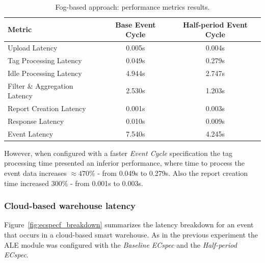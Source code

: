 \begin{table}[ht!]
  \centering
    \begin{tabular}{|l|c|c|}
    \hline
    Metric                            & Base Event Cycle & Half-period Event Cycle \\ \hline
    Upload Latency                    & 0.005s           & 0.004s                  \\ \hline
    Tag Processing Latency            & 0.049s           & 0.279s                  \\ \hline
    Idle Processing Latency           & 4.944s           & 2.747s                  \\ \hline
    Filter \& Aggregation Latency     & 2.530s           & 1.203s                  \\ \hline
    Report Creation Latency           & 0.001s           & 0.003s                  \\ \hline
    Response Latency                  & 0.010s           & 0.009s                  \\ \hline
    Event Latency                     & 7.540s           & 4.245s                  \\ \hline
    \end{tabular}
  \caption[Fog-based approach: performance results.]{Fog-based approach: performance metrics results.}
  \label{table:fog_metrics}
\end{table}

However, when configured with a faster \textit{Event Cycle} specification the tag processing time
presented an inferior performance, where time to process the event data increases $\approx470\%$
- from 0.049s to 0.279s. Also the report creation time increased $300\%$ - from 0.001s to 0.003s.\\

\subsubsection{Cloud-based warehouse latency}
\label{subs:eval_exp_latency_ecspec_fast}
Figure~\ref{fig:ecspecf_breakdown} summarizes the latency breakdown for an event that occurs in a cloud-based
smart warehouse. As in the previous experiment the \gls{ALE} module was configured with the
\textit{Baseline ECspec} and the \textit{Half-period ECspec}.\\

